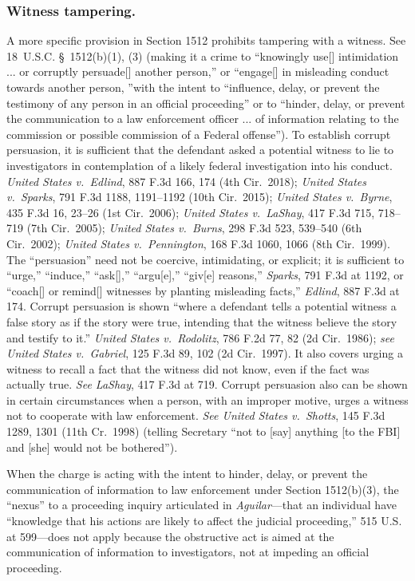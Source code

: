 \subsubsection*{Witness tampering.}

A more specific provision in Section 1512 prohibits tampering with a witness.
See 18~U.S.C. \S~1512(b)(1), (3) (making it a crime to “knowingly use[] intimidation ... or corruptly persuade[] another person,” or “engage[] in misleading conduct towards another person, ”with the intent to “influence, delay, or prevent the testimony of any person in an official proceeding” or to “hinder, delay, or prevent the communication to a law enforcement officer ... of information relating to the commission or possible commission of a Federal offense”).
To establish corrupt persuasion, it is sufficient that the defendant asked a potential witness to lie to investigators in contemplation of a likely federal investigation into his conduct.
\textit{United States v.\ Edlind}, 887 F.3d 166, 174 (4th Cir.~2018);
\textit{United States v.\ Sparks}, 791 F.3d 1188, 1191--1192 (10th Cir.~2015);
\textit{United States v.\ Byrne}, 435 F.3d 16, 23--26 (1st Cir.~2006);
\textit{United States v.\ LaShay}, 417 F.3d 715, 718--719 (7th Cir.~2005);
\textit{United States v.\ Burns}, 298 F.3d 523, 539--540 (6th Cir.~2002);
\textit{United States v.\ Pennington}, 168 F.3d 1060, 1066 (8th Cir.~1999).
The “persuasion” need not be coercive, intimidating, or explicit;
it is sufficient to “urge,” “induce,” “ask[],” “argu[e],” “giv[e] reasons,”
\textit{Sparks}, 791 F.3d at 1192, or “coach[] or remind[] witnesses by planting misleading facts,”
\textit{Edlind}, 887 F.3d at 174.
Corrupt persuasion is shown “where a defendant tells a potential witness a false story as if the story were true, intending that the witness believe the story and testify to it.”
\textit{United States v.\ Rodolitz}, 786 F.2d 77, 82 (2d Cir.~1986);
\textit{see United States v.\ Gabriel}, 125 F.3d 89, 102 (2d Cir.~1997).
It also covers urging a witness to recall a fact that the witness did not know, even if the fact was actually true.
\textit{See LaShay}, 417 F.3d at 719.
Corrupt persuasion also can be shown in certain circumstances when a person, with an improper motive, urges a witness not to cooperate with law enforcement.
\textit{See United States v.\ Shotts}, 145 F.3d 1289, 1301 (11th Cr.~1998) (telling Secretary “not to [say] anything [to the FBI] and [she] would not be bothered”).

When the charge is acting with the intent to hinder, delay, or prevent the communication of information to law enforcement under Section 1512(b)(3), the “nexus” to a proceeding inquiry articulated in \textit{Aguilar}---that an individual have “knowledge that his actions are likely to affect the judicial proceeding,” 515 U.S. at 599---does not apply because the obstructive act is aimed at the communication of information to investigators, not at impeding an official proceeding.

